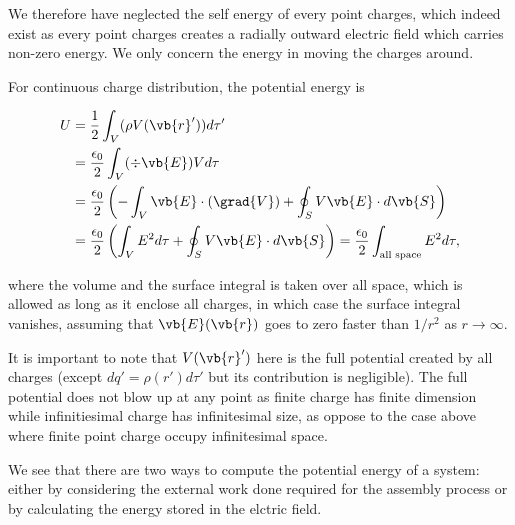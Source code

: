 \documentclass[english,a4paper,12pt]{report}
\begin{document}
We therefore have neglected the self energy of every point charges, which indeed exist as every point charges creates a radially outward electric field which carries non-zero energy. We only concern the energy in moving the charges around.

For continuous charge distribution, the potential energy is 

\begin{equation}
    \begin{aligned} 
    U &= \frac{1}{2} \int_{V}^{} ( \rho V(\vb{r} '))d\tau' \\
    &= \frac{\epsilon _{0} }{2}\int_{V}^{}  (\div{\vb{E} })Vd\tau  \\
    &= \frac{\epsilon _{0} }{2}\left( -\int_{V}^{} \vb{E} \cdot (\grad{V} ) + \oint_{S} V\vb{E} \cdot d\vb{S}   \right) \\
    &= \frac{\epsilon _{0} }{2}\left( \int_{V}^{} E^2d\tau + \oint_{S} V\vb{E} \cdot d\vb{S} \right) = \frac{\epsilon _{0} }{2} \int_{\text{all space}}^{} E^2d\tau ,
    \end{aligned}    
\end{equation}

where the volume and the surface integral is taken over all space, which is allowed as long as it enclose all charges, in which case the surface integral vanishes, assuming that \(\vb{E} (\vb{r} )\) goes to zero faster than \(1/r^2\) as \(r \to \infty\).   

It is important to note that \(V(\vb{r} ')\) here is the full potential created by all charges (except \(dq' = \rho (r') d\tau '\) but its contribution is negligible). The full potential does not blow up at any point as finite charge has finite dimension while infinitiesimal charge has infinitesimal size, as oppose to the case above where finite point charge occupy infinitesimal space. 

We see that there are two ways to compute the potential energy of a system: either by considering the external work done required for the assembly process or by calculating the energy stored in the elctric field.
\end{document}

